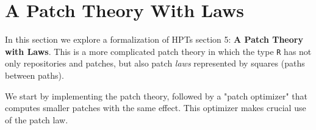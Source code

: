 \section{A Patch Theory With Laws}\label{sec/laws-noTrunc-noIndep}

In this section we explore a formalization of HPTs section 5: \textbf{A Patch Theory with Laws}.
This is a more complicated patch theory in which the type \texttt{R} has not only repositories
and patches, but also patch \emph{laws} represented by squares (paths between paths).

We start by implementing the patch theory, followed by a "patch optimizer" that computes
smaller patches with the same effect. This optimizer makes crucial use of the patch law.

\begin{code}[hide]%
\>[0]\AgdaSymbol{\{-\#}\AgdaSpace{}%
\AgdaSpace{}%
\AgdaSpace{}%
\AgdaSpace{}%
\AgdaSymbol{\#-\}}\<%
\\
%
\\[\AgdaEmptyExtraSkip]%
\>[0]\AgdaSpace{}%
\AgdaSpace{}%
\<%
\\
%
\\[\AgdaEmptyExtraSkip]%
\>[0]\AgdaSpace{}%
\AgdaSpace{}%
\<%
\\
\>[0][@{}l@{\AgdaIndent{0}}]%
\>[2]\AgdaSymbol{(}%
\>[13]\AgdaSymbol{;}\AgdaSpace{}%
\AgdaOperator{\AgdaFunction{\#\AgdaUnderscore{}}}\AgdaSpace{}%
\AgdaSymbol{;}\AgdaSpace{}%
\AgdaSpace{}%
\AgdaSymbol{;}\AgdaSpace{}%
\AgdaSymbol{)}\<%
\\
\>[0]\AgdaSpace{}%
\AgdaSpace{}%
\<%
\\
\>[0][@{}l@{\AgdaIndent{0}}]%
\>[2]\AgdaSymbol{(}\AgdaSpace{}%
\AgdaSymbol{;}\AgdaSpace{}%
\AgdaSpace{}%
\AgdaSymbol{;}\AgdaSpace{}%
\AgdaOperator{\AgdaFunction{\AgdaUnderscore{}==\AgdaUnderscore{}}}\AgdaSymbol{)}\<%
\\
\>[0]\AgdaSpace{}%
\AgdaSpace{}%
\<%
\\
\>[0][@{}l@{\AgdaIndent{0}}]%
\>[2]\AgdaSymbol{(}\AgdaSpace{}%

\end{code}
